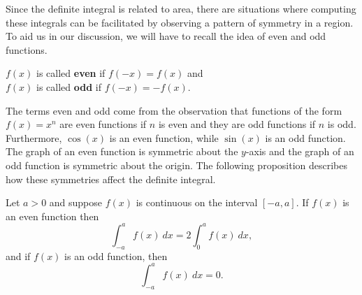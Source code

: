 \documentclass{ximera}
\begin{document}
Since the definite integral is related to area, there are situations where 
computing these integrals can be facilitated by observing a pattern of symmetry 
in a region. To aid us in our discussion, we will have to recall the idea of 
even and odd functions.

\begin{definition}
$f(x)$ is called \textbf{even} if $f(-x) = f(x)$ and\\
$f(x)$ is called \textbf{odd} if $f(-x) = -f(x)$.
\end{definition}
The terms even and odd come from the observation that
functions of the form $f(x) = x^n$ are even functions if $n$ is even and they are
odd functions if $n$ is odd. Furthermore, $\cos(x)$ is an even function, while $\sin(x)$ is an odd function.
The graph of an 
even function is symmetric about the $y$-axis and the graph of an odd function is symmetric about the origin.
The following proposition describes how these symmetries affect the definite integral.

\begin{proposition}
Let $a>0$ and suppose $f(x)$ is continuous on the interval $[-a, a]$.
If $f(x)$ is an even function then
\[\int_{-a}^a f(x) \ dx = 2 \int_0^a f(x) \ dx,\]
and if $f(x)$ is an odd function, then 
\[\int_{-a}^a f(x) \ dx = 0.\]
\end{proposition}  

%

\begin{image}
\end{image}
\end{document}
